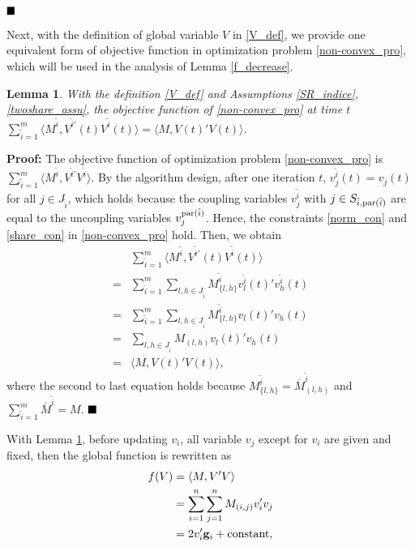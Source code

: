 \documentclass[journal]{IEEEtran}
\newtheorem{lemma}{Lemma}[section]
\begin{document}
$\hfill\blacksquare$
\par Next, with the definition of global variable $V$ in \eqref{V_def}, we provide one equivalent form of objective function in optimization problem \eqref{non-convex_pro}, which will be used in the analysis of Lemma \ref{f_decrease}.
\begin{lemma}\label{ques_equal}
With the definition \eqref{V_def} and Assumptions \ref{SR_indice}, \ref{twoshare_assu}, the objective function of \eqref{non-convex_pro} at time $t$ $\sum_{\tilde{i}=1}^m \langle M^{\tilde{i}} ,V^{\tilde{i}'}(t)V^{\tilde{i}}(t)\rangle =\langle M,V(t)'V(t)\rangle$.
\end{lemma}
\par\textbf{Proof:}
The objective function of optimization problem \eqref{non-convex_pro} is $\sum_{\tilde{i}=1}^m \langle M^{\tilde{i}} ,V^{\tilde{i}'}V^{\tilde{i}}\rangle$. By the algorithm design, after one iteration $t$, $v_j^{\tilde{i}}(t)=v_j(t)$ for all $j\in J_{\tilde{i}}$, which holds because the coupling variables $v_j^{\tilde{i}}$ with $j\in S_{\tilde{i},{\rm par}(\tilde{i})}$ are equal to the uncoupling variables $v_j^{{\rm par}(\tilde{i})}$. Hence, the constraints \eqref{norm_con} and \eqref{share_con} in \eqref{non-convex_pro} hold. Then, we obtain
\begin{align*}
&\sum_{\tilde{i}=1}^m \langle M^{\tilde{i}} ,V^{\tilde{i}'}(t)V^{\tilde{i}}(t)\rangle\\
=&\sum_{\tilde{i}=1}^m \sum_{l,h\in J_{\tilde{i}}} M^{\tilde{i}}_{\{l,h\}} v^{\tilde{i}}_{l}(t)'v^{\tilde{i}}_{h}(t)\\
=&\sum_{\tilde{i}=1}^m \sum_{l,h\in J_{\tilde{i}}} M^{\tilde{i}}_{\{l,h\}} v_{l}(t)'v_{h}(t)\\
=&\sum_{l,h\in J_{\tilde{i}}} M_{(l,h)} v_{l}(t)'v_{h}(t)\\
=&\langle M,V(t)'V(t)\rangle,
\end{align*} 
where the second to last equation holds because $M^{\tilde{i}}_{\{l,h\}}=\overline{M}^{\tilde{i}}_{(l,h)}$ and $\sum_{\tilde{i}=1}^m \overline{M}^{\tilde{i}}=M$.
$\hfill\blacksquare$
\par With Lemma \ref{ques_equal}, before updating $v_i$, all variable $v_j$ except for $v_i$ are given and fixed, then the global function is rewritten as
\begin{align}\label{trans_pro}
f(V)&=\left<M, V'V\right>\notag\\&=\sum_{i=1}^n \sum_{j=1}^n M_{(i,j)} v_i'v_j \notag\\
&=2v_i'\mathbf{g}_i+{\rm constant},
\end{align}
\end{document}
